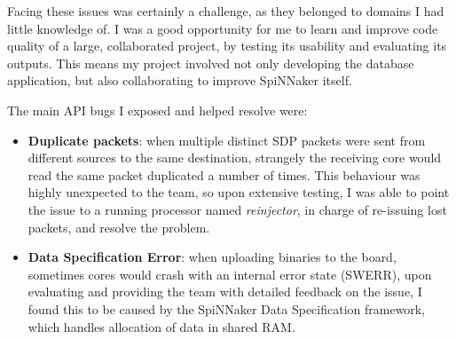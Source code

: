 Facing these issues was certainly a challenge, as they belonged to domains I had little knowledge of. I was a good opportunity for me to learn and improve code quality of a large, collaborated project, by testing its usability and evaluating its outputs. This means my project involved not only developing the database application, but also collaborating to improve SpiNNaker itself.

The main API bugs I exposed and helped resolve were:

\begin{itemize}
\item \textbf{Duplicate packets}: when multiple distinct SDP packets were sent from different sources to the same destination, strangely the receiving core would read the same packet duplicated a number of times. This behaviour was highly unexpected to the team, so upon extensive testing, I was able to point the issue to a running processor named \textit{reinjector}, in charge of re-issuing lost packets, and resolve the problem. 
\item \textbf{Data Specification Error}: when uploading binaries to the board, sometimes cores would crash with an internal error state (SWERR), upon evaluating and providing the team with detailed feedback on the issue, I found this to be caused by the SpiNNaker Data Specification framework, which handles allocation of data in shared RAM.

\end{itemize}